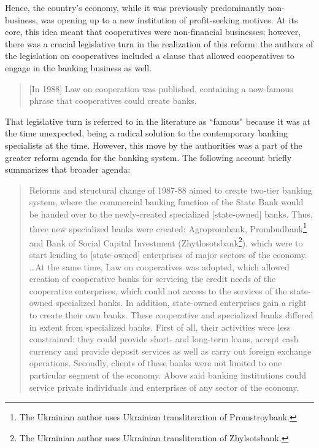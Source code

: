 Hence, the country's economy, while it was prev\acp{iou}ly predominantly non-business, was opening up to a new institution of profit-seeking motives. At its core, this idea meant that cooperatives were non-financial businesses; however, there was a crucial legislative turn in the realization of this reform: the authors of the legislation on cooperatives included a clause that allowed cooperatives to engage in the banking business as well. 

\begin{quote}
[In 1988] Law on cooperation was published, containing a now-famous phrase that cooperatives could create banks.~\citep[p.~56]{krotov2008b}
\end{quote}

That legislative turn is referred to in the literature as ``famous" because it was at the time unexpected, being a radical solution to the contemporary banking specialists at the time. However, this move by the authorities was a part of the greater reform agenda for the banking system. The following account briefly summarizes that broader agenda:

\begin{quote}
Reforms and structural change of 1987-88 aimed to create two-tier banking system, where the commercial banking function of the State Bank would be handed over to the newly-created specialized [state-owned] banks. Thus, three new specialized banks were created: Agroprombank, Prombudbank\footnote{The Ukrainian author uses Ukrainian transliteration of Promstroybank.} and Bank of Social Capital Investment (Zhytlosotsbank\footnote{The Ukrainian author uses Ukrainian transliteration of Zhylsotsbank.}), which were to start lending to [state-owned] enterprises of major sectors of the economy. \dots At the same time, Law on cooperatives was adopted, which allowed creation of cooperative banks for servicing the credit needs of the cooperative enterprises, which could not access to the services of the state-owned specialized banks. In addition, state-owned enterprises gain a right to create their own banks. These cooperative and specialized banks differed in extent from specialized banks. First of all, their activities were less constrained: they could provide short- and long-term loans, accept cash currency and provide deposit services as well as carry out foreign exchange operations. Secondly, clients of these banks were not limited to one particular segment of the economy. Above said banking institutions could service private individuals and enterprises of any sector of the economy.~\citep[p.~121]{petryk2010}
\end{quote}

